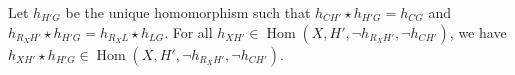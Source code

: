 \begin{lemma}
    \label{lem:1_ex}
                

    Let $h_{H'G}$ be the unique homomorphism such that $h_{CH'} \mathop{\star} h_{H'G} \mathop{=} h_{CG}$ and $h_{R_XH'} \mathop{\star} h_{H'G} \mathop{=} h_{R_XL} \mathop{\star} h_{LG}$. For all $h_{XH'} \mathop{\in} \operatorname{Hom}(X, H', \lnot h_{R_XH'}, \lnot h_{CH'})$, we have $h_{XH'} \mathop{\star} h_{H'G} \mathop{\in} \operatorname{Hom}(X, H', \lnot h_{R_XH'}, \lnot h_{CH'})$.    
\end{lemma}
